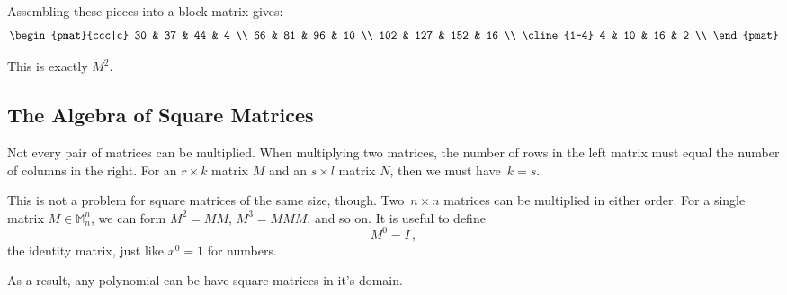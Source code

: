 \begin{itemize}
Assembling these pieces into a block matrix gives:
\[
\begin{pmat}{ccc|c}
30 & 37 & 44 & 4 \\
66 & 81 & 96 & 10 \\
102 & 127 & 152 & 16 \\
\cline{1-4}
4 & 10 & 16 & 2 \\
\end{pmat}
\]

This is exactly $M^2$.
\end{itemize}

\subsection{The Algebra of Square Matrices }

Not every pair of matrices can be multiplied.  When multiplying two matrices, the number of rows in the left matrix must equal the number of columns in the right.  For an $r\times k$ matrix $M$ and an $s\times l$ matrix $N$, then we must have~$k=s$.

This is not a problem for square matrices of the same size, though.  Two~$n\times n$ matrices can be multiplied in either order.  For a single matrix $M \in \mathbb{M}^n_n$, we can form $M^2=MM$, $M^3=MMM$, and so on. It is useful to define $$M^0=I\, ,$$ the identity matrix, just like $x^0=1$ for numbers.

As a result, any polynomial  can be have square matrices in it's domain. 

